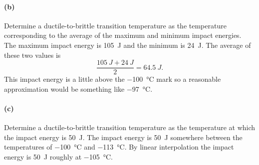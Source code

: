 \paragraph{(b)} Determine a ductile-to-brittle transition temperature as the temperature corresponding to the average of the maximum and minimum impact energies.
\bigbreak
The maximum impact energy is \qty{105}{J} and the minimum is \qty{24}{J}. The average of these two values is
\[ 
\frac{\qty{105}{J} + \qty{24}{J}}{2} = \qty{64,5}{J} 
.\]
This impact energy is a little above the \qty{-100}{\celsius} mark so a reasonable approximation would be something like \qty{-97}{\celsius}.

\paragraph{(c)} Determine a ductile-to-brittle transition temperature as the temperature at which the impact energy is \qty{50}{J}.
\bigbreak
The impact energy is \qty{50}{J} somewhere between the temperatures of \qty{-100}{\celsius} and \qty{-113}{\celsius}. By linear interpolation the impact energy is \qty{50}{J} roughly at \qty{-105}{\celsius}.
